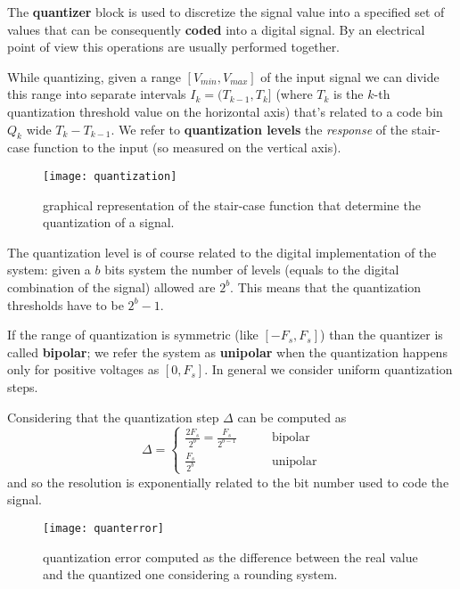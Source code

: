 	The \textbf{quantizer} block is used to discretize the signal value into a specified set of values that can be consequently \textbf{coded} into a digital signal. By an electrical point of view this operations are usually performed together.	
	
	While quantizing, given a range $[V_{min},V_{max}]$ of the input signal we can divide this range into separate intervals $I_k = (T_{k-1},T_k]$ (where $T_k$ is the $k$-th quantization threshold value on the horizontal axis) that's related to a code bin $Q_k$ wide $T_k - T_{k-1}$. We refer to \textbf{quantization levels} the \textit{response} of the stair-case function to the input (so measured on the vertical axis).
	
	\begin{SCfigure}[2][bht]
		\centering
		\texttt{[image: quantization]}
		\caption{graphical representation of the stair-case function that determine the quantization of a signal.}
	\end{SCfigure}
	
	The quantization level is of course related to the digital implementation of the system: given a $b$ bits system the number of levels (equals to the digital combination of the signal) allowed are $2^b$. This means that the quantization thresholds have to be $2^b-1$.  
	
	If the range of quantization is symmetric (like $[-F_s,F_s]$) than the quantizer is called \textbf{bipolar}; we refer the system as \textbf{unipolar} when the quantization happens only for positive voltages as $[0,F_s]$. In general we consider uniform quantization steps.

	Considering that the quantization step $\Delta$ can be computed as
	\[ \Delta = \begin{cases}
		\frac{2F_s}{2^b} = \frac{F_s}{2^{b-1}} \qquad & \textrm{bipolar} \\
		\frac{F_s}{2^b} & \textrm{unipolar}
 	\end{cases} \]
 	and so the resolution is exponentially related to the bit number used to code the signal.
 	
 	\begin{SCfigure}[2][bht]
 		\centering
 		\texttt{[image: quanterror]}
 		\caption{quantization error computed as the difference between the real value and the quantized one considering a rounding system.}
 	\end{SCfigure}
	
